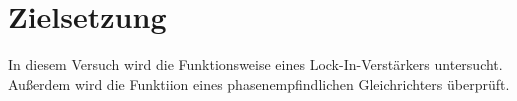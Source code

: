 \section{Zielsetzung}

In diesem Versuch wird die Funktionsweise eines Lock-In-Verstärkers untersucht. Außerdem wird die Funktiion
eines phasenempfindlichen Gleichrichters überprüft.

